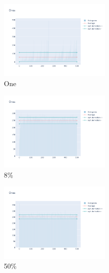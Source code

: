 \documentclass[12pt, fleqn]{report}                             %
\theoremstyle{break}                                            %
\begin{document}
      \begin{figure}[ht!]
        \centering
        \begin{subfigure}[b]{0.4\linewidth}
          \includegraphics[width=0.6\textwidth]{Images/126/dia-a.png}
          \caption{One}
        \end{subfigure}
        \begin{subfigure}[b]{0.4\linewidth}
          \includegraphics[width=0.6\textwidth]{Images/126/dia-b.png}
          \caption{8\%}
        \end{subfigure}
        \begin{subfigure}[b]{0.4\linewidth}
          \includegraphics[width=0.6\textwidth]{Images/126/dia-c.png}
          \caption{50\%}
        \end{subfigure}
        \begin{subfigure}[b]{0.4\linewidth}

\end{subfigure}
\end{figure}
\end{document}
